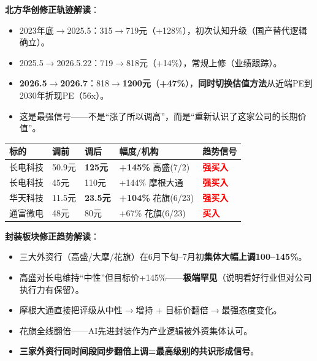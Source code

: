\documentclass[a4paper,11pt,fontset=none]{ctexart}
\begin{document}
\textbf{北方华创修正轨迹解读}：
\begin{itemize}
  \item 2023年底$\to$2025.5：315$\to$719元（+128\%），初次认知升级（国产替代逻辑确立）。
  \item 2025.5$\to$2026.5.22：719$\to$818元（+14\%），常规上修（业绩跟踪）。
  \item \textbf{2026.5$\to$2026.7}：818$\to$\textbf{1200元}（\textbf{+47\%}），\textbf{同时切换估值方法}从近端PE到2030年折现PE（56x）。
  \item 这是最强信号——不是``涨了所以调高''，而是``重新认识了这家公司的长期价值''。
\end{itemize}

\begin{exhibitbox}
\begin{tabularx}{\textwidth}{L{2cm}L{2cm}L{2cm}L{2.5cm}X}
\toprule
\textbf{标的} & \textbf{调前} & \textbf{调后} & \textbf{幅度/机构} & \textbf{趋势信号} \\
\midrule
长电科技 & 50.9元 & \textbf{125元} & \textbf{+145\%} 高盛(7/2) & \textcolor{red}{\textbf{强买入}} \\
长电科技 & 45元 & 110元 & +144\% 摩根大通 & \textcolor{red}{\textbf{强买入}} \\
华天科技 & 11.5元 & \textbf{23.5元} & \textbf{+104\%} 花旗(6/23) & \textcolor{red}{\textbf{强买入}} \\
通富微电 & 48元 & 80元 & +67\% 花旗(6/23) & \textcolor{red}{\textbf{买入}} \\
\bottomrule
\end{tabularx}
\end{exhibitbox}

\textbf{封装板块修正趋势解读}：
\begin{itemize}
  \item 三大外资行（高盛/大摩/花旗）在6月下旬--7月初\textbf{集体大幅上调100--145\%}。
  \item 高盛对长电维持``中性''但目标价+145\%——\textbf{极端罕见}（说明看好行业但对公司执行力有保留）。
  \item 摩根大通直接把评级从中性$\to$增持 + 目标价翻倍$\to$最强态度变化。
  \item 花旗全线翻倍——AI先进封装作为产业逻辑被外资集体认可。
  \item \textbf{三家外资行同时间段同步翻倍上调=最高级别的共识形成信号}。
\end{itemize}
\end{document}
